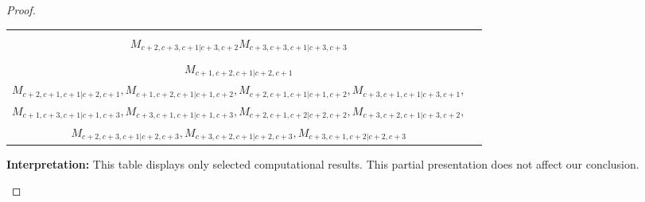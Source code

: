 \begin{proof}
\begin{enumerate}
\begin{enumerate}
\begin{table}[htbp]
\begin{tabular}{cc}
{$M_{c+3,c+2,c+1|c+2,c+3}
M_{c+2,c+3,c+1|c+2,c+3}
M_{c+3,c+2,c+1|c+3,c+2}$ \\
$M_{c+2,c+3,c+1|c+3,c+2}
M_{c+3,c+3,c+1|c+3,c+3}$
  }\\
    & \\
    $M_{c+1,c+2,c+1|c+2,c+1}$ & \makecell{
$M_{c+1,c+3,c+1|c+3,c+1},
M_{c+1,c+2,c+2|c+2,c+2},
M_{c+2,c+3,c+1|c+3,c+2},
M_{c+1,c+3,c+2|c+2,c+3},$ \\
$M_{c+2,c+1,c+1|c+2,c+1},
M_{c+1,c+2,c+1|c+1,c+2},
M_{c+2,c+1,c+1|c+1,c+2},
M_{c+3,c+1,c+1|c+3,c+1},$ \\
$M_{c+1,c+3,c+1|c+1,c+3},
M_{c+3,c+1,c+1|c+1,c+3},
M_{c+2,c+1,c+2|c+2,c+2},
M_{c+3,c+2,c+1|c+3,c+2},$ \\
$M_{c+2,c+3,c+1|c+2,c+3},
M_{c+3,c+2,c+1|c+2,c+3},
M_{c+3,c+1,c+2|c+2,c+3}$
    } \\
\bottomrule
\end{tabular}
\vspace{0.5em}
\parbox{\linewidth}{\small
\textbf{Interpretation:} 
This table displays only selected computational results. This partial presentation does not affect our conclusion.
}
\end{table}
    \end{enumerate}


\end{enumerate}
\end{proof}
